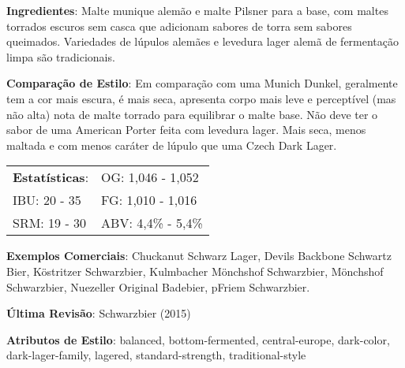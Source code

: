 \textbf{Ingredientes}: Malte munique alemão e malte Pilsner para a base, com maltes torrados escuros sem casca que adicionam sabores de torra sem sabores queimados. Variedades de lúpulos alemães e levedura lager alemã de fermentação limpa são tradicionais.

\textbf{Comparação de Estilo}: Em comparação com uma Munich Dunkel, geralmente tem a cor mais escura, é mais seca, apresenta corpo mais leve e perceptível (mas não alta) nota de malte torrado para equilibrar o malte base. Não deve ter o sabor de uma American Porter feita com levedura lager. Mais seca, menos maltada e com menos caráter de lúpulo que uma Czech Dark Lager.

\begin{tabular}{@{}p{35mm}p{35mm}@{}}
  \textbf{Estatísticas}: & OG: 1,046 - 1,052 \\
  IBU: 20 - 35 & FG: 1,010 - 1,016 \\
  SRM: 19 - 30 & ABV: 4,4\% - 5,4\%
\end{tabular}

\textbf{Exemplos Comerciais}: Chuckanut Schwarz Lager, Devils Backbone Schwartz Bier, Köstritzer Schwarzbier, Kulmbacher Mönchshof Schwarzbier, Mönchshof Schwarzbier, Nuezeller Original Badebier, pFriem Schwarzbier.

\textbf{Última Revisão}: Schwarzbier (2015)

\textbf{Atributos de Estilo}: balanced, bottom-fermented, central-europe, dark-color, dark-lager-family, lagered, standard-strength, traditional-style
